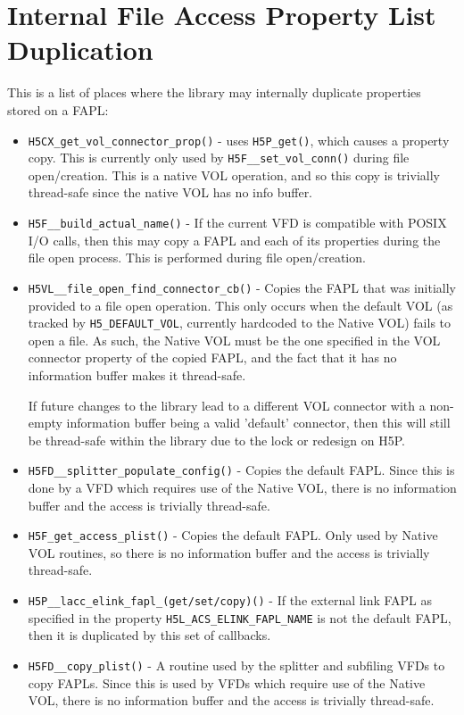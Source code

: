 \section{Internal File Access Property List Duplication}
\label{sec:internal-property-copies}

This is a list of places where the library may internally duplicate properties stored on a FAPL:

\begin{itemize}
    \item \texttt{H5CX\_get\_vol\_connector\_prop()} - uses \texttt{H5P\_get()}, which causes a property copy. This is currently only used by \texttt{H5F\_\_set\_vol\_conn()} during file open/creation. This is a native VOL operation, and so this copy is trivially thread-safe since the native VOL has no info buffer.

    \item \texttt{H5F\_\_build\_actual\_name()} - If the current VFD is compatible with POSIX I/O calls, then this may copy a FAPL and each of its properties during the file open process. This is performed during file open/creation.
    
    \item \texttt{H5VL\_\_file\_open\_find\_connector\_cb()} - Copies the FAPL that was initially provided to a file open operation. This only occurs when the default VOL (as tracked by \texttt{H5\_DEFAULT\_VOL}, currently hardcoded to the Native VOL) fails to open a file. As such, the Native VOL must be the one specified in the VOL connector property of the copied FAPL, and the fact that it has no information buffer makes it thread-safe.

    If future changes to the library lead to a different VOL connector with a non-empty information buffer being a valid 'default' connector, then this will still be thread-safe within the library due to the lock or redesign on H5P.

    \item \texttt{H5FD\_\_splitter\_populate\_config()} - Copies the default FAPL. Since this is done by a VFD which requires use of the Native VOL, there is no information buffer and the access is trivially thread-safe.

    \item \texttt{H5F\_get\_access\_plist()} - Copies the default FAPL. Only used by Native VOL routines, so there is no information buffer and the access is trivially thread-safe.

    \item \texttt{H5P\_\_lacc\_elink\_fapl\_(get/set/copy)()} - If the external link FAPL as specified in the property \texttt{H5L\_ACS\_ELINK\_FAPL\_NAME} is not the default FAPL, then it is duplicated by this set of callbacks.

    \item \texttt{H5FD\_\_copy\_plist()} - A routine used by the splitter and subfiling VFDs to copy FAPLs. Since this is used by VFDs which require use of the Native VOL, there is no information buffer and the access is trivially thread-safe.
\end{itemize}